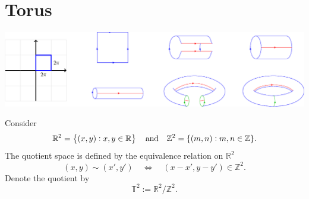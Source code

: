 \documentclass[11pt,openany]{article}
\renewcommand{\Re}{\operatorname*{Re}}
\renewcommand{\Im}{\operatorname*{Im}}
\begin{document}
%	
%	
%	
%	
%	
%	
%	

\newpage
\section{Torus}
\begin{center}
\includegraphics[scale=.85]{../tikz/grad-math-tikz-algebra/torus.pdf}
\end{center}
Consider \[
\mathbb{R}^2=\set{(x,y):x,y\in\mathbb{R}}\quad\text{and}\quad\mathbb{Z}^2 = \{(m,n) : m,n \in \mathbb{Z}\}.
\] The quotient space is defined by the equivalence relation on \(\mathbb{R}^2\) \[
(x,y) \sim (x',y') \quad \Longleftrightarrow \quad (x-x',y-y') \in \mathbb{Z}^2.
\] Denote the quotient by \[
\mathbb{T}^2 := \mathbb{R}^2/\mathbb{Z}^2.
\]
\end{document}
